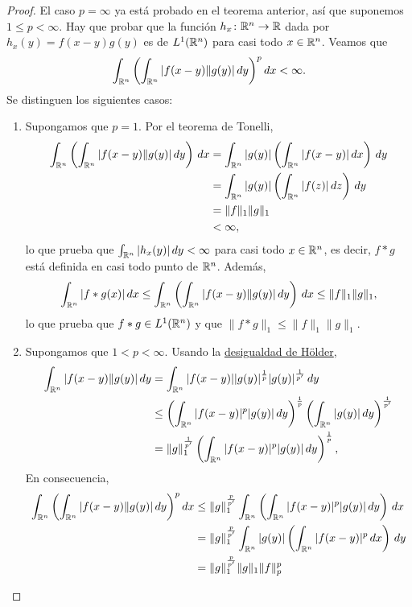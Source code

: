 \documentclass[a4paper, 11pt, oneside]{report}
\begin{document}
\begin{proof}
  El caso $p = \infty$ ya está probado en el teorema anterior, así que suponemos $1 \leq p < \infty$. Hay que probar que la función $h_x \colon \mathbb R^n \to \mathbb R$ dada por $h_x(y)=f(x-y)g(y)$ es de $L^1(\mathbb R^n)$ para casi todo $x \in \mathbb R^n$. Veamos que
  \[\int_{\mathbb R^n} \left(\int_{\mathbb R^n} |f(x-y)\|g(y)| \, dy\right)^p dx < \infty.\]
  Se distinguen los siguientes casos:
  \begin{enumerate}
    \item Supongamos que $p = 1$. Por el teorema de Tonelli,
    \[\begin{aligned}[t]
      \int_{\mathbb R^n}\left(\int_{\mathbb R^n} |f(x-y)\|g(y)|\, dy\right) \, dx &= \int_{\mathbb R^n} |g(y)| \left(\int_{\mathbb R^n} |f(x-y)|\, dx\right) \, dy \\
      &= \int_{\mathbb R^n} |g(y)| \left(\int_{\mathbb R^n} |f(z)| \, dz\right) \, dy \\
      &= \|f\|_1 \|g\|_1 \\
      &< \infty,
    \end{aligned}\]
    lo que prueba que $\int_{\mathbb R^n} |h_x(y)|\, dy < \infty$ para casi todo $x \in \mathbb R^n$, es decir, $f \ast g$ está definida en casi todo punto de $\mathbb R^n$. Además,
    \[\int_{\mathbb R^n} |f \ast g(x)| \, dx \leq \int_{\mathbb R^n} \left(\int_{\mathbb R^n} |f(x-y)\|g(y)| \, dy\right) \, dx \leq \|f\|_1 \|g\|_1,\]
    lo que prueba que $f \ast g \in L^1(\mathbb R^n)$ y que $\|f \ast g\|_1 \leq \|f\|_1\|g\|_1$.
    \item Supongamos que $1 < p < \infty$. Usando la \hyperref[teo:1.2.6]{\color{c1}desigualdad de Hölder},
    \[\begin{aligned}[t]
      \int_{\mathbb R^n} |f(x-y)\|g(y)| \, dy &= \int_{\mathbb R^n} |f(x-y)| |g(y)|^{\frac{1}{p}} |g(y)|^{\frac{1}{p'}} \, dy \\
      &\leq \left(\int_{\mathbb R^n} |f(x-y)|^p|g(y)| \, dy\right)^{\frac{1}{p}} \left(\int_{\mathbb R^n} |g(y)| \, dy\right)^{\frac{1}{p'}} \\
      &= \|g\|_1^{\frac{1}{p'}}\left(\int_{\mathbb R^n} |f(x-y)|^p|g(y)| \, dy\right)^{\frac{1}{p}},
    \end{aligned}\]
    En consecuencia,
    \[\begin{aligned}[t]
      \int_{\R^n} \left(\int_{\R^n} |f(x-y)\|g(y)| \, dy\right)^p dx &\leq \|g\|_1^{\frac{p}{p'}}\int_{\R^n} \left(\int_{\R^n} |f(x-y)|^p |g(y)| \, dy\right) \, dx \\
      &= \|g\|_1^{\frac{p}{p'}} \int_{\R^n} |g(y)| \left(\int_{\R^n}|f(x-y)|^p \, dx\right) \, dy \\
      &= \|g\|_1^{\frac{p}{p'}}\|g\|_1\|f\|_p^p \\

\end{aligned}\]
\end{enumerate}
\end{proof}
\end{document}
